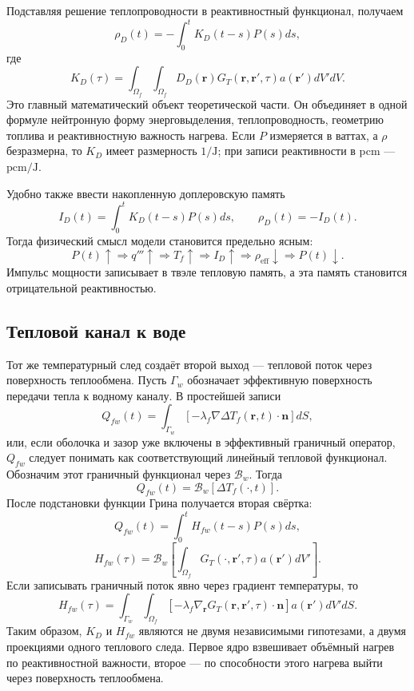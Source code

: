\documentclass[12pt]{article}
\begin{document}
Подставляя решение теплопроводности в реактивностный функционал, получаем
\[
\rho_D(t)
=
-\int_0^tK_D(t-s)P(s)ds,
\]
где
\[
\boxed{
K_D(\tau)
=
\int_{\Omega_f}\int_{\Omega_f}
D_D(\mathbf r)
G_T(\mathbf r,\mathbf r',\tau)
a(\mathbf r')dV'dV.
}
\]
Это главный математический объект теоретической части. Он объединяет в одной формуле нейтронную форму энерговыделения, теплопроводность, геометрию топлива и реактивностную важность нагрева. Если \(P\) измеряется в ваттах, а \(\rho\) безразмерна, то \(K_D\) имеет размерность \(1/\mathrm{J}\); при записи реактивности в pcm --- \(\mathrm{pcm}/\mathrm{J}\).

Удобно также ввести накопленную доплеровскую память
\[
I_D(t)=\int_0^tK_D(t-s)P(s)ds,
\qquad
\rho_D(t)=-I_D(t).
\]
Тогда физический смысл модели становится предельно ясным:
\[
P(t)\uparrow
\Rightarrow
q'''\uparrow
\Rightarrow
T_f\uparrow
\Rightarrow
I_D\uparrow
\Rightarrow
\rho_{\mathrm{eff}}\downarrow
\Rightarrow
P(t)\downarrow.
\]
Импульс мощности записывает в твэле тепловую память, а эта память становится отрицательной реактивностью.

\subsection{Тепловой канал к воде}

Тот же температурный след создаёт второй выход --- тепловой поток через поверхность теплообмена. Пусть \(\Gamma_w\) обозначает эффективную поверхность передачи тепла к водному каналу. В простейшей записи
\[
Q_{fw}(t)
=
\int_{\Gamma_w}
\left[-\lambda_f\nabla\Delta T_f(\mathbf r,t)\cdot\mathbf n\right]dS,
\]
или, если оболочка и зазор уже включены в эффективный граничный оператор, \(Q_{fw}\) следует понимать как соответствующий линейный тепловой функционал. Обозначим этот граничный функционал через \(\mathcal B_w\). Тогда
\[
Q_{fw}(t)=\mathcal B_w[\Delta T_f(\cdot,t)].
\]
После подстановки функции Грина получается вторая свёртка:
\[
Q_{fw}(t)
=
\int_0^tH_{fw}(t-s)P(s)ds,
\]
\[
\boxed{
H_{fw}(\tau)
=
\mathcal B_w\left[
\int_{\Omega_f}G_T(\cdot,\mathbf r',\tau)a(\mathbf r')dV'
\right].
}
\]
Если записывать граничный поток явно через градиент температуры, то
\[
H_{fw}(\tau)=
\int_{\Gamma_w}\int_{\Omega_f}
\left[-\lambda_f\nabla_{\mathbf r}G_T(\mathbf r,\mathbf r',\tau)\cdot\mathbf n\right]
a(\mathbf r')dV'dS.
\]
Таким образом, \(K_D\) и \(H_{fw}\) являются не двумя независимыми гипотезами, а двумя проекциями одного теплового следа. Первое ядро взвешивает объёмный нагрев по реактивностной важности, второе --- по способности этого нагрева выйти через поверхность теплообмена.
\end{document}
